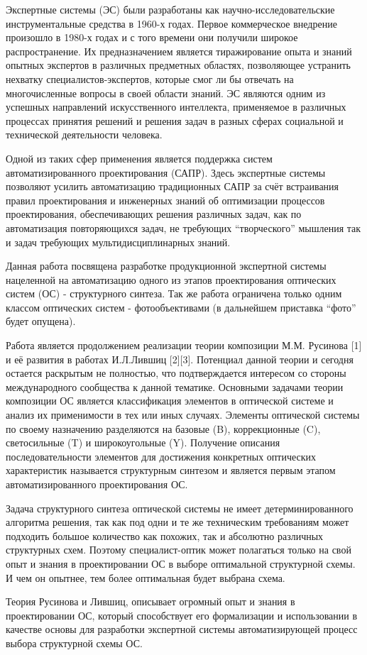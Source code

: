 \intro
Экспертные системы (ЭС) были разработаны как научно-исследовательские инструментальные средства в 1960-х годах. Первое коммерческое внедрение произошло в 1980-х годах и с того времени они получили широкое распространение. Их предназначением является тиражирование опыта и знаний опытных экспертов в различных предметных областях, позволяющее устранить нехватку специалистов-экспертов, которые смог ли бы отвечать на многочисленные вопросы в своей области знаний. ЭС являются одним из успешных направлений искусственного интеллекта, применяемое в различных процессах принятия решений и решения задач в разных сферах социальной и технической деятельности человека.

Одной из таких сфер применения является поддержка систем автоматизированного проектирования (САПР). Здесь экспертные системы позволяют усилить автоматизацию традиционных САПР за счёт встраивания правил проектирования и инженерных знаний об оптимизации процессов проектирования, обеспечивающих решения различных задач, как по автоматизация повторяющихся задач, не требующих “творческого” мышления так и задач требующих мультидисциплинарных знаний.

Данная работа посвящена разработке продукционной экспертной системы нацеленной на автоматизацию одного из этапов проектирования оптических систем (ОС) - структурного синтеза. Так же работа ограничена только одним классом оптических систем - фотообъективами (в дальнейшем приставка “фото” будет опущена).

Работа является продолжением реализации теории композиции М.М. Русинова [1] и её развития в работах И.Л.Лившиц [2][3]. Потенциал данной теории и сегодня остается раскрытым не полностью, что подтверждается интересом со стороны международного сообщества к данной тематике. Основными задачами теории композиции ОС является классификация элементов в оптической системе и анализ их применимости в тех или иных случаях. Элементы оптической системы по своему назначению разделяются на базовые (B), коррекционные (C), светосильные (T) и широкоугольные (Y). Получение описания последовательности элементов для достижения конкретных оптических характеристик называется структурным синтезом и является первым этапом автоматизированного проектирования ОС.

Задача структурного синтеза оптической системы не имеет детерминированного алгоритма решения, так как под одни и те же техническим требованиям может подходить большое количество как похожих, так и абсолютно различных структурных схем. Поэтому специалист-оптик может полагаться только на свой опыт и знания в проектировании ОС в выборе оптимальной структурной схемы. И чем он опытнее, тем более оптимальная будет выбрана схема.

Теория Русинова и Лившиц, описывает огромный опыт и знания в проектировании ОС, который способствует его формализации и использовании в качестве основы для разработки экспертной системы автоматизирующей процесс выбора структурной схемы ОС.